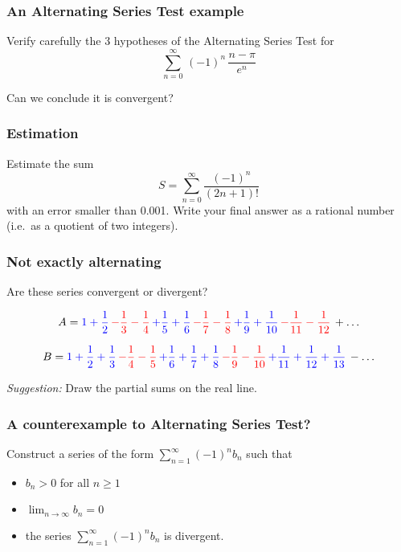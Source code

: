 \documentclass[14pt]{beamer}
\newcommand{\azul}[1]{{\color{blue} #1}}
\newcommand{\rojo}[1]{{\color{red} #1}}
\newcommand{\setsize}[1]{\fontsize{#1}{#1}\selectfont} %
\newcommand{\smallerfont}{\setsize{13}} %
\newcommand{\vvv}{\vspace{.2cm}}
\begin{document}
	\begin{frame}[t]
		\frametitle{ An Alternating Series Test example}

		Verify carefully the 3 hypotheses of the Alternating Series Test for
		\[
			\sum_{n=0}^{\infty}\, (-1)^{n} \, \frac{n - \pi}{e^{n}}
		\]

		Can we conclude it is convergent?
	\end{frame}
	\begin{frame}[t]
		\frametitle{Estimation}

		Estimate the sum
		\[
			S = \sum_{n=0}^{\infty}\frac{(-1)^{n}}{(2n+1)!}
		\]
		with an error smaller than 0.001. Write your final answer as a rational number
		(i.e.\ as a quotient of two integers).
	\end{frame}
	\begin{frame}[t]
		\smallerfont
		\frametitle{Not exactly alternating}

		Are these series convergent or divergent?

		\[
			A = \azul{1 + \frac{1}{2}}\, \rojo{ - \frac{1}{3} - \frac{1}{4}}\, \azul{ + \frac{1}{5} + \frac{1}{6}}
			\, \rojo{ - \frac{1}{7} - \frac{1}{8}}\, \azul{ + \frac{1}{9} + \frac{1}{10}}
			\, \rojo{ - \frac{1}{11} - \frac{1}{12}}\, + \ldots
		\]

		\[
			B = \azul{1 + \frac{1}{2} + \frac{1}{3}}\, \rojo{ - \frac{1}{4} - \frac{1}{5}}
			\, \azul{ + \frac{1}{6} + \frac{1}{7} + \frac{1}{8}}\, \rojo{ - \frac{1}{9} - \frac{1}{10}}
			\, \azul{ + \frac{1}{11} + \frac{1}{12} + \frac{1}{13}}\, - \ldots
		\]
		\vvv

		\emph{Suggestion:} Draw the partial sums on the real line.
	\end{frame}
	\begin{frame}[t]
		\frametitle{A counterexample to Alternating Series Test?}

		Construct a series of the form
		${\displaystyle \sum_{n=1}^{\infty} (-1)^n b_n}$ such that
		\begin{itemize}
			\item ${\displaystyle b_n >0}$ for all $n \geq 1$
				\vspace{.4cm}

			\item ${\displaystyle \lim_{n \to \infty} b_n = 0}$

			\item the series ${\displaystyle \sum_{n=1}^{\infty} (-1)^n b_n}$ is divergent.
		\end{itemize}
	\end{frame}
\end{document}
